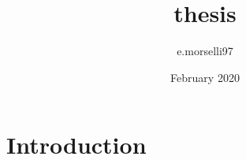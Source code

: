 \documentclass{article}
\title{thesis}
\author{e.morselli97 }
\date{February 2020}
\begin{document}
\maketitle

\section{Introduction}
\end{document}
